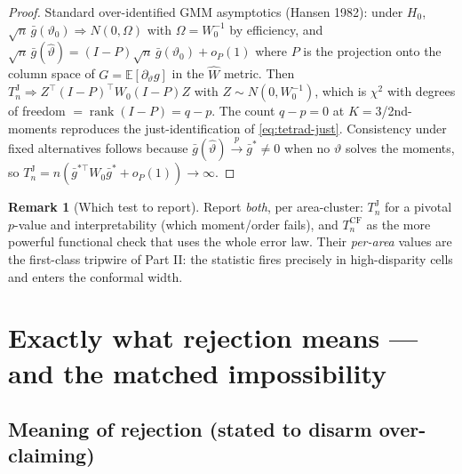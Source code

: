 \documentclass[11pt]{article}
\theoremstyle{definition}
\newtheorem{remark}{Remark}
\newcommand{\E}{\mathbb{E}}
\newcommand{\wto}{\Rightarrow}
\newcommand{\cyto}{\overset{p}{\to}}
\DeclareMathOperator{\rank}{rank}
\begin{document}
\begin{proof}
Standard over-identified GMM asymptotics (Hansen 1982): under $H_0$,
$\sqrt n\,\bar g(\vartheta_0)\wto N(0,\Omega)$ with $\Omega=W_0^{-1}$ by
efficiency, and $\sqrt n\,\bar g(\widehat\vartheta)
=(I-P)\sqrt n\,\bar g(\vartheta_0)+o_P(1)$ where $P$ is the projection onto the
column space of $G=\E[\partial_\vartheta g]$ in the $\widehat W$ metric. Then
$T_n^{\mathrm J}\wto Z^\top(I-P)^\top W_0(I-P)Z$ with $Z\sim N(0,W_0^{-1})$,
which is $\chi^2$ with degrees of freedom $=\rank(I-P)=q-p$. The count
$q-p=0$ at $K=3$/2nd-moments reproduces the just-identification of
\eqref{eq:tetrad-just}. Consistency under fixed alternatives follows because
$\bar g(\widehat\vartheta)\cyto \bar g^*\neq0$ when no $\vartheta$ solves the
moments, so $T_n^{\mathrm J}=n(\bar g^{*\top}W_0\bar g^*+o_P(1))\to\infty$.
\end{proof}

\begin{remark}[Which test to report]
Report \emph{both}, per area-cluster: $T_n^{\mathrm J}$ for a pivotal
$p$-value and interpretability (which moment/order fails), and
$T_n^{\mathrm{CF}}$ as the more powerful functional check that uses the whole
error law. Their \emph{per-area} values are the first-class tripwire of Part II:
the statistic fires precisely in high-disparity cells and enters the conformal
width.
\end{remark}

\section{Exactly what rejection means --- and the matched impossibility}
\label{sec:decomp}

\subsection{Meaning of rejection (stated to disarm over-claiming)}
\end{document}

